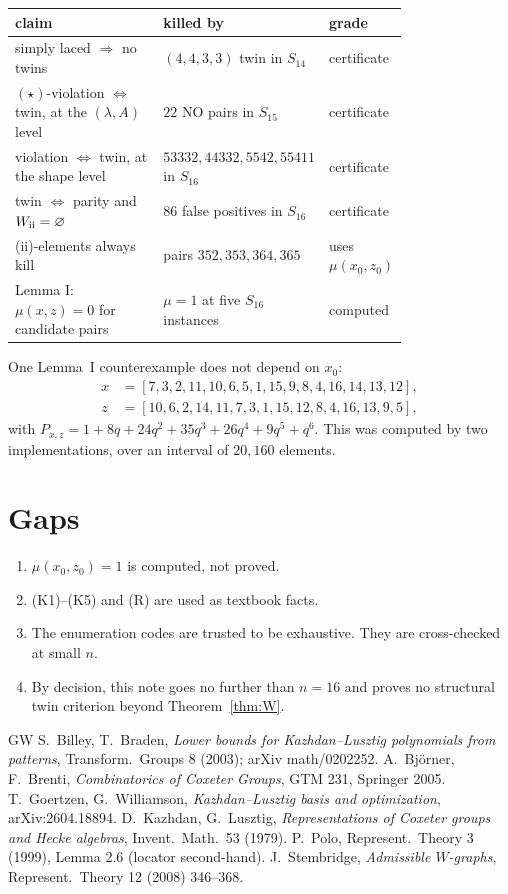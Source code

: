 \documentclass[11pt]{amsart}
\theoremstyle{plain}
\theoremstyle{definition}
\begin{document}
{\small
\begin{tabular}{@{}p{0.42\linewidth}p{0.36\linewidth}l@{}}\toprule
claim & killed by & grade\\\midrule
simply laced $\Rightarrow$ no twins & $(4,4,3,3)$ twin in $S_{14}$ & certificate\\
$(\star)$-violation $\iff$ twin, at the $(\lambda,A)$ level & $22$ NO pairs in $S_{15}$ & certificate\\
violation $\iff$ twin, at the shape level & $53332,44332,5542,55411$ in $S_{16}$ & certificate\\
twin $\iff$ parity and $W_{\rm ii}=\varnothing$ & $86$ false positives in $S_{16}$ & certificate\\
(ii)-elements always kill & pairs $352,353,364,365$ & uses $\mu(x_0,z_0)$\\
Lemma I: $\mu(x,z)=0$ for candidate pairs & $\mu=1$ at five $S_{16}$ instances & computed\\\bottomrule
\end{tabular}}

\smallskip
\noindent One Lemma~I counterexample does not depend on $x_0$:
\begin{align*}x&=[7,3,2,11,10,6,5,1,15,9,8,4,16,14,13,12],\\ z&=[10,6,2,14,11,7,3,1,15,12,8,4,16,13,9,5],\end{align*}
with $P_{x,z}=1+8q+24q^2+35q^3+26q^4+9q^5+q^6$. This was computed by two implementations, over an interval of $20{,}160$ elements.

\section{Gaps}
\begin{enumerate}[leftmargin=*,itemsep=0pt]
\item $\mu(x_0,z_0)=1$ is computed, not proved.
\item (K1)--(K5) and (R) are used as textbook facts.
\item The enumeration codes are trusted to be exhaustive. They are cross-checked at small $n$.
\item By decision, this note goes no further than $n=16$ and proves no structural twin criterion beyond Theorem~\ref{thm:W}.
\end{enumerate}

\begin{thebibliography}{GW}\small
{} S.~Billey, T.~Braden, \emph{Lower bounds for Kazhdan--Lusztig polynomials from patterns}, Transform.\ Groups 8 (2003); arXiv math/0202252.
 A.~Björner, F.~Brenti, \emph{Combinatorics of Coxeter Groups}, GTM 231, Springer 2005.
 T.~Goertzen, G.~Williamson, \emph{Kazhdan--Lusztig basis and optimization}, arXiv:2604.18894.
 D.~Kazhdan, G.~Lusztig, \emph{Representations of Coxeter groups and Hecke algebras}, Invent.\ Math.\ 53 (1979).
 P.~Polo, Represent.\ Theory 3 (1999), Lemma 2.6 (locator second-hand).
 J.~Stembridge, \emph{Admissible $W$-graphs}, Represent.\ Theory 12 (2008) 346--368.
\end{thebibliography}
\end{document}
